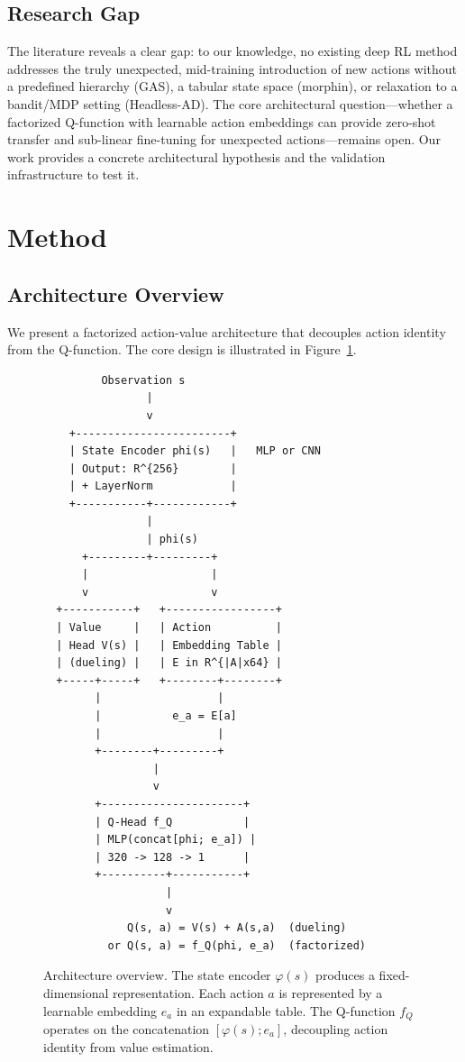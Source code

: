 \documentclass{article}
\begin{document}
\subsection{Research Gap}

The literature reveals a clear gap: to our knowledge, no existing deep RL
method addresses the truly unexpected, mid-training introduction of new actions
without a predefined hierarchy (GAS), a tabular state space (morphin), or
relaxation to a bandit/MDP setting (Headless-AD). The core architectural
question---whether a factorized Q-function with learnable action embeddings can
provide zero-shot transfer and sub-linear fine-tuning for unexpected
actions---remains open. Our work provides a concrete architectural hypothesis
and the validation infrastructure to test it.


\section{Method}
\label{sec:method}

\subsection{Architecture Overview}

We present a factorized action-value architecture that decouples action identity
from the Q-function. The core design is illustrated in Figure~\ref{fig:arch}.

\begin{figure}[h]
  \centering
  \begin{minipage}{0.85\linewidth}
  {\small
  \begin{verbatim}
         Observation s
                |
                v
    +------------------------+
    | State Encoder phi(s)   |   MLP or CNN
    | Output: R^{256}        |
    | + LayerNorm            |
    +-----------+------------+
                |
                | phi(s)
      +---------+---------+
      |                   |
      v                   v
  +-----------+   +-----------------+
  | Value     |   | Action          |
  | Head V(s) |   | Embedding Table |
  | (dueling) |   | E in R^{|A|x64} |
  +-----+-----+   +--------+--------+
        |                  |
        |           e_a = E[a]
        |                  |
        +--------+---------+
                 |
                 v
        +----------------------+
        | Q-Head f_Q           |
        | MLP(concat[phi; e_a]) |
        | 320 -> 128 -> 1      |
        +----------+-----------+
                   |
                   v
             Q(s, a) = V(s) + A(s,a)  (dueling)
          or Q(s, a) = f_Q(phi, e_a)  (factorized)
  \end{verbatim}
  }
  \end{minipage}
  \caption{Architecture overview. The state encoder $\varphi(s)$ produces a
  fixed-dimensional representation. Each action $a$ is represented by a
  learnable embedding $e_a$ in an expandable table. The Q-function $f_Q$
  operates on the concatenation $[\varphi(s); e_a]$, decoupling action identity
  from value estimation.}
  \label{fig:arch}
\end{figure}
\end{document}
